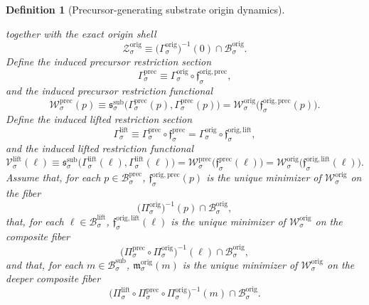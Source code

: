 \documentclass[11pt]{article}
\newcommand{\SubBody}[1]{\mathcal B_{#1}^{\mathrm{sub}}}
\newcommand{\SubPair}[1]{\mathfrak s_{#1}^{\mathrm{sub}}}
\newcommand{\LiftBody}[1]{\mathcal B_{#1}^{\mathrm{lift}}}
\newcommand{\LiftProj}[1]{\Pi_{#1}^{\mathrm{lift}}}
\newcommand{\LiftSection}[1]{\Gamma_{#1}^{\mathrm{lift}}}
\newcommand{\LiftFunctional}[1]{\mathscr V_{#1}^{\mathrm{lift}}}
\newcommand{\PrecBody}[1]{\mathcal B_{#1}^{\mathrm{prec}}}
\newcommand{\PrecProj}[1]{\Pi_{#1}^{\mathrm{prec}}}
\newcommand{\PrecLiftMin}[1]{\mathfrak f_{#1}^{\mathrm{prec}}}
\newcommand{\PrecSection}[1]{\Gamma_{#1}^{\mathrm{prec}}}
\newcommand{\PrecFunctional}[1]{\mathscr W_{#1}^{\mathrm{prec}}}
\newcommand{\OrigBody}[1]{\mathcal B_{#1}^{\mathrm{orig}}}
\newcommand{\OrigProj}[1]{\Pi_{#1}^{\mathrm{orig}}}
\newcommand{\OrigPrecMin}[1]{\mathfrak f_{#1}^{\mathrm{orig,prec}}}
\newcommand{\OrigLiftMin}[1]{\mathfrak f_{#1}^{\mathrm{orig,lift}}}
\newcommand{\OrigSubMin}[1]{\mathfrak m_{#1}^{\mathrm{orig}}}
\newcommand{\OrigSection}[1]{\Gamma_{#1}^{\mathrm{orig}}}
\newcommand{\OrigFunctional}[1]{\mathscr W_{#1}^{\mathrm{orig}}}
\newcommand{\OrigShellSet}[1]{\mathcal Z_{#1}^{\mathrm{orig}}}
\newtheorem{definition}{Definition}
\begin{document}
\begin{definition}[Precursor-generating substrate origin dynamics]
\begin{enumerate}
    together with the exact origin shell
    \begin{equation}
    \OrigShellSet{\sigma}
    \equiv
    \bigl(\OrigSection{\sigma}\bigr)^{-1}(0)\cap\OrigBody{\sigma}.
    \label{eq:origshell}
    \end{equation}
    Define the induced precursor restriction section
    \begin{equation}
    \PrecSection{\sigma}
    \equiv
    \OrigSection{\sigma}\circ\OrigPrecMin{\sigma},
    \label{eq:originducedprecsection}
    \end{equation}
    and the induced precursor restriction functional
    \begin{equation}
    \PrecFunctional{\sigma}(p)
    \equiv
    \SubPair{\sigma}\bigl(\PrecSection{\sigma}(p),\PrecSection{\sigma}(p)\bigr)
    =
    \OrigFunctional{\sigma}\bigl(\OrigPrecMin{\sigma}(p)\bigr).
    \label{eq:originducedprecfunctional}
    \end{equation}
    Define the induced lifted restriction section
    \begin{equation}
    \LiftSection{\sigma}
    \equiv
    \PrecSection{\sigma}\circ\PrecLiftMin{\sigma}
    =
    \OrigSection{\sigma}\circ\OrigLiftMin{\sigma},
    \label{eq:originducedliftsection}
    \end{equation}
    and the induced lifted restriction functional
    \begin{equation}
    \LiftFunctional{\sigma}(\ell)
    \equiv
    \SubPair{\sigma}\bigl(\LiftSection{\sigma}(\ell),\LiftSection{\sigma}(\ell)\bigr)
    =
    \PrecFunctional{\sigma}\bigl(\PrecLiftMin{\sigma}(\ell)\bigr)
    =
    \OrigFunctional{\sigma}\bigl(\OrigLiftMin{\sigma}(\ell)\bigr).
    \label{eq:originducedliftfunctional}
    \end{equation}
    Assume that, for each \(p\in\PrecBody{\sigma}\), \(\OrigPrecMin{\sigma}(p)\) is the unique minimizer of \(\OrigFunctional{\sigma}\) on the fiber
    \[
    \bigl(\OrigProj{\sigma}\bigr)^{-1}(p)\cap\OrigBody{\sigma},
    \]
    that, for each \(\ell\in\LiftBody{\sigma}\), \(\OrigLiftMin{\sigma}(\ell)\) is the unique minimizer of \(\OrigFunctional{\sigma}\) on the composite fiber
    \[
    \bigl(\PrecProj{\sigma}\circ\OrigProj{\sigma}\bigr)^{-1}(\ell)\cap\OrigBody{\sigma},
    \]
    and that, for each \(m\in\SubBody{\sigma}\), \(\OrigSubMin{\sigma}(m)\) is the unique minimizer of \(\OrigFunctional{\sigma}\) on the deeper composite fiber
    \[
    \bigl(\LiftProj{\sigma}\circ\PrecProj{\sigma}\circ\OrigProj{\sigma}\bigr)^{-1}(m)\cap\OrigBody{\sigma}.
    \]

\end{enumerate}
\end{definition}
\end{document}
